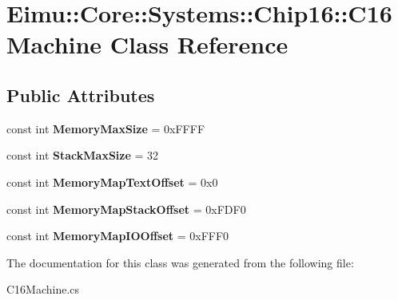 \hypertarget{class_eimu_1_1_core_1_1_systems_1_1_chip16_1_1_c16_machine}{
\section{Eimu::Core::Systems::Chip16::C16Machine Class Reference}
\label{class_eimu_1_1_core_1_1_systems_1_1_chip16_1_1_c16_machine}
}
\subsection*{Public Attributes}
\begin{DoxyCompactItemize}
\item 
\hypertarget{class_eimu_1_1_core_1_1_systems_1_1_chip16_1_1_c16_machine_aba42a39ef65276d149f5a45f77404329}{
const int {\bfseries MemoryMaxSize} = 0xFFFF}
\label{class_eimu_1_1_core_1_1_systems_1_1_chip16_1_1_c16_machine_aba42a39ef65276d149f5a45f77404329}

\item 
\hypertarget{class_eimu_1_1_core_1_1_systems_1_1_chip16_1_1_c16_machine_a91a73743b59bc20708ed47b14d903ddb}{
const int {\bfseries StackMaxSize} = 32}
\label{class_eimu_1_1_core_1_1_systems_1_1_chip16_1_1_c16_machine_a91a73743b59bc20708ed47b14d903ddb}

\item 
\hypertarget{class_eimu_1_1_core_1_1_systems_1_1_chip16_1_1_c16_machine_a8a614400b5ff28d5e8604839c9e0e97e}{
const int {\bfseries MemoryMapTextOffset} = 0x0}
\label{class_eimu_1_1_core_1_1_systems_1_1_chip16_1_1_c16_machine_a8a614400b5ff28d5e8604839c9e0e97e}

\item 
\hypertarget{class_eimu_1_1_core_1_1_systems_1_1_chip16_1_1_c16_machine_aefa0d87c83606fe22d5fcc6f0ef53f5a}{
const int {\bfseries MemoryMapStackOffset} = 0xFDF0}
\label{class_eimu_1_1_core_1_1_systems_1_1_chip16_1_1_c16_machine_aefa0d87c83606fe22d5fcc6f0ef53f5a}

\item 
\hypertarget{class_eimu_1_1_core_1_1_systems_1_1_chip16_1_1_c16_machine_a2ec9037e916165316930d7edf63f0854}{
const int {\bfseries MemoryMapIOOffset} = 0xFFF0}
\label{class_eimu_1_1_core_1_1_systems_1_1_chip16_1_1_c16_machine_a2ec9037e916165316930d7edf63f0854}

\end{DoxyCompactItemize}


The documentation for this class was generated from the following file:\begin{DoxyCompactItemize}
\item 
C16Machine.cs\end{DoxyCompactItemize}
